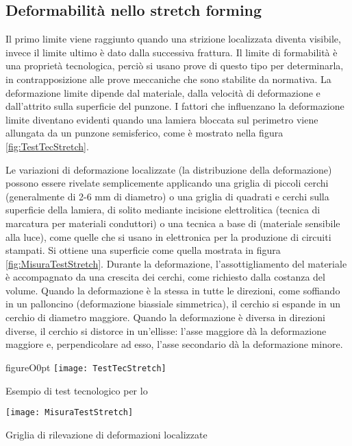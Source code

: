 \subsection{Deformabilità nello stretch forming}
Il primo limite viene raggiunto quando una strizione localizzata diventa visibile, invece il limite ultimo è dato dalla successiva frattura.
Il limite di formabilità è una proprietà tecnologica, perciò si usano prove di questo tipo per determinarla, in contrapposizione alle prove meccaniche che sono stabilite da normativa. La deformazione limite dipende dal materiale, dalla velocità di deformazione e dall'attrito sulla superficie del punzone.
I fattori che influenzano la deformazione limite diventano evidenti quando una lamiera bloccata sul perimetro viene allungata da un punzone semisferico, come è mostrato nella figura \ref{fig:TestTecStretch}.

Le variazioni di deformazione localizzate (la distribuzione della deformazione) possono essere rivelate semplicemente applicando una griglia di piccoli cerchi (generalmente di 2-6 mm di diametro) o una griglia di quadrati e cerchi sulla superficie della lamiera, di solito mediante incisione elettrolitica (tecnica di marcatura per materiali conduttori) o una tecnica a base di  (materiale sensibile alla luce), come quelle che si usano in elettronica per la produzione di circuiti stampati. Si ottiene una superficie come quella mostrata in figura \ref{fig:MisuraTestStretch}.
Durante la deformazione, l'assottigliamento del materiale è accompagnato da una crescita dei cerchi, come richiesto dalla costanza del volume.
Quando la deformazione è la stessa in tutte le direzioni, come soffiando in un palloncino (deformazione biassiale simmetrica), il cerchio si espande in un cerchio di diametro maggiore.
Quando la deformazione è diversa in direzioni diverse, il cerchio si distorce in un'ellisse: l'asse maggiore dà la deformazione maggiore e, perpendicolare ad esso, l'asse secondario dà la deformazione minore.

\begin{wrapfloat}{figure}{O}{0pt}
\texttt{[image: TestTecStretch]}
\caption{Esempio di test tecnologico per lo }
\label{fig:TestTecStretch}
\texttt{[image: MisuraTestStretch]}
\caption{Griglia di rilevazione di deformazioni localizzate}
\label{fig:MisuraTestStretch}
\end{wrapfloat}

